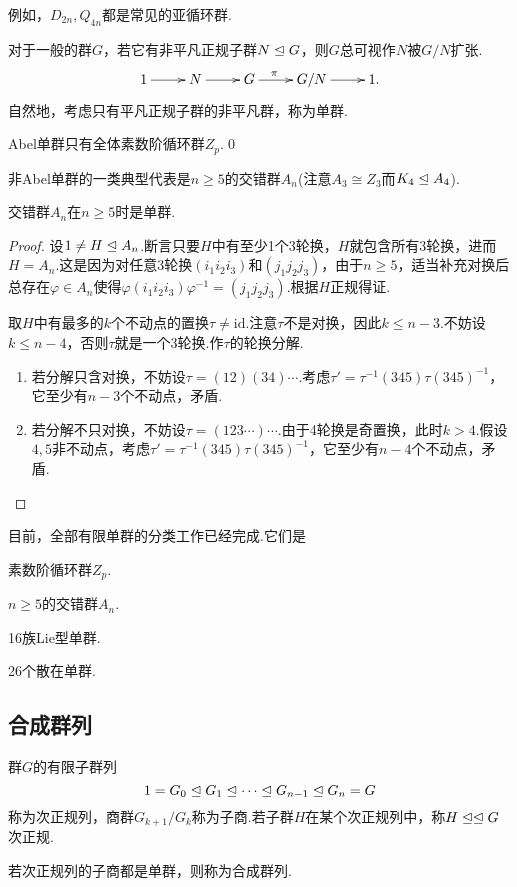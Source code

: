 例如，$D_{2n},Q_{4n}$都是常见的亚循环群.

对于一般的群$G$，若它有非平凡正规子群$N\trianglelefteq G$，则$G$总可视作$N$被$G/N$扩张.
\[
	\xymatrix{
		1\ar[r]&N\ar[r]&G\ar[r]^(0.4)\pi&G/N\ar[r]&1.
	}
\]
自然地，考虑只有平凡正规子群的非平凡群，称为{\heiti 单群}.\hypertarget{text:Simple}{}

\begin{prop}
	Abel单群只有全体素数阶循环群$Z_p$.\qed
\end{prop}

非Abel单群的一类典型代表是$n\ge 5$的交错群$A_n$(注意$A_3\cong Z_3$而$K_4\trianglelefteq A_4$).

\begin{thm}
	交错群$A_n$在$n\ge 5$时是单群.
\end{thm}
\begin{proof}
	设$1\ne H\trianglelefteq A_n$.断言只要$H$中有至少1个3轮换，$H$就包含所有3轮换，进而$H=A_n$.这是因为对任意3轮换$(i_1i_2i_3)$和$(j_1j_2j_3)$，由于$n\ge 5$，适当补充对换后总存在$\varphi\in A_n$使得$\varphi(i_1i_2i_3)\varphi^{-1}=(j_1j_2j_3)$.根据$H$正规得证.

	取$H$中有最多的$k$个不动点的置换$\tau\ne\mathrm{id}$.注意$\tau$不是对换，因此$k\le n-3$.不妨设$k\le n-4$，否则$\tau$就是一个3轮换.作$\tau$的轮换分解.
	\begin{enumerate}
		\item 若分解只含对换，不妨设$\tau=(12)(34)\cdots$.考虑$\tau'=\tau^{-1}(345)\tau(345)^{-1}$，它至少有$n-3$个不动点，矛盾.
		\item 若分解不只对换，不妨设$\tau=(123\cdots)\cdots$.由于4轮换是奇置换，此时$k>4$.假设$4,5$非不动点，考虑$\tau'=\tau^{-1}(345)\tau(345)^{-1}$，它至少有$n-4$个不动点，矛盾.
	\end{enumerate}
\end{proof}

目前，全部有限单群的分类工作已经完成.它们是

\noindent\begin{enumerate*}
	\item 素数阶循环群$Z_p$.
	\item $n\ge 5$的交错群$A_n$.
	\item 16族Lie型单群.
	\item 26个散在单群.
\end{enumerate*}

\subsection{合成群列}
\begin{definition}
	群$G$的有限子群列
	\[
		1=G_0\trianglelefteq G_1\trianglelefteq\cdots\trianglelefteq G_{n-1}\trianglelefteq G_n=G
	\]
	称为{\heiti 次正规列}，商群$G_{k+1}/G_k$称为{\heiti 子商}.若子群$H$在某个次正规列中，称$H\trianglelefteq\trianglelefteq G$ {\heiti 次正规}.
	
	若次正规列的子商都是单群，则称为{\heiti 合成群列}.
\end{definition}

